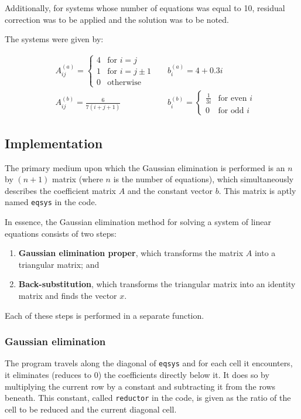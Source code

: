 \documentclass{article}
\begin{document}
	Additionally, for systems whose number of equations was equal to 10,
	residual correction was to be applied and the solution was to be noted.
	
	The systems were given by:
	
	\noindent
	\begin{align*}
		&A_{ij}^{(a)} =
		\begin{cases} 
			4 & \text{for } i = j \\
			1 & \text{for } i = j \pm 1 \\
			0 & \text{otherwise}
		\end{cases}
		&&
		b_i^{(a)} = 4 + 0.3i
		\\
		&A_{ij}^{(b)} = \frac{6}{7(i + j + 1)}
		&&
		b_i^{(b)} =
		\begin{cases} 
			\frac{1}{3i} & \text{for even } i\\
			0 & \text{for odd } i
		\end{cases}
	\end{align*}
	
	\subsection{Implementation}
	
	The primary medium upon which the Gaussian elimination is performed is an
	$n$ by $(n + 1)$ matrix (where $n$ is the number of equations), which
	simultaneously describes the coefficient matrix $A$ and the constant vector
	$b$. This matrix is aptly named \texttt{eqsys} in the code.
	
	In essence, the Gaussian elimination method for solving a system of linear
	equations consists of two steps:
	
	\begin{enumerate}
		\item \textbf{Gaussian elimination proper}, which transforms the
		matrix $A$ into a triangular matrix; and
		\item \textbf{Back-substitution}, which transforms the triangular
		matrix into an identity matrix and finds the vector $x$.
	\end{enumerate}
	
	Each of these steps is performed in a separate function.
	
	\subsubsection{Gaussian elimination}
	
	The program travels along the diagonal of \texttt{eqsys} and for each cell
	it encounters, it eliminates (reduces to $0$) the coefficients directly
	below it. It does so by multiplying the current row by a constant and
	subtracting it from the rows beneath. This constant, called
	\texttt{reductor} in the code, is given as the ratio of the cell to be
	reduced and the current diagonal cell.
	
\end{document}
